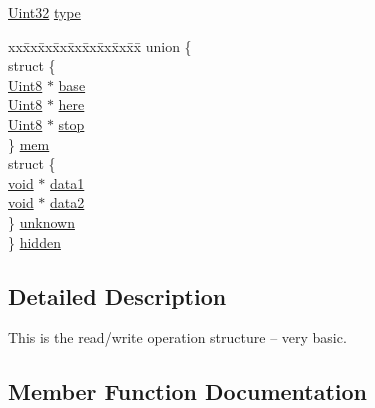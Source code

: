 \begin{DoxyCompactItemize}
\mbox{\hyperlink{_s_d_l__stdinc_8h_add440eff171ea5f55cb00c4a9ab8672d}{Uint32}} \mbox{\hyperlink{struct_s_d_l___r_wops_a099017bfceaac24ced0e4d08a4e0a023}{type}}
\item 
\begin{tabbing}
xx\=xx\=xx\=xx\=xx\=xx\=xx\=xx\=xx\=\kill
union \{\\
\>struct \{\\
\>\>\mbox{\hyperlink{_s_d_l__stdinc_8h_a2944638813a090aa23e62f4da842c3e2}{Uint8}} $\ast$ \mbox{\hyperlink{struct_s_d_l___r_wops_af9b489d7342296ce197b911cfa93b2ab}{base}}\\
\>\>\mbox{\hyperlink{_s_d_l__stdinc_8h_a2944638813a090aa23e62f4da842c3e2}{Uint8}} $\ast$ \mbox{\hyperlink{struct_s_d_l___r_wops_a6fc84601c17e347c6ef24c63a79deb57}{here}}\\
\>\>\mbox{\hyperlink{_s_d_l__stdinc_8h_a2944638813a090aa23e62f4da842c3e2}{Uint8}} $\ast$ \mbox{\hyperlink{struct_s_d_l___r_wops_a4108a41afa8b62e75b0f160de4b56103}{stop}}\\
\>\} \mbox{\hyperlink{struct_s_d_l___r_wops_a540713999ec73a45a71b3f12b674c2b0}{mem}}\\
\>struct \{\\
\>\>\mbox{\hyperlink{_s_d_l__opengles2__gl2ext_8h_ae5d8fa23ad07c48bb609509eae494c95}{void}} $\ast$ \mbox{\hyperlink{struct_s_d_l___r_wops_ab89d27b4312c0b9d664c81bc92917fc8}{data1}}\\
\>\>\mbox{\hyperlink{_s_d_l__opengles2__gl2ext_8h_ae5d8fa23ad07c48bb609509eae494c95}{void}} $\ast$ \mbox{\hyperlink{struct_s_d_l___r_wops_aca073130e2e262eb11e86e1be993e215}{data2}}\\
\>\} \mbox{\hyperlink{struct_s_d_l___r_wops_a6b636d6299921142a119931d76a588b7}{unknown}}\\
\} \mbox{\hyperlink{struct_s_d_l___r_wops_a282e9150d26585bdf1590726190e62f3}{hidden}}\\

\end{tabbing}\end{DoxyCompactItemize}


\subsection{Detailed Description}
This is the read/write operation structure -- very basic. 

\subsection{Member Function Documentation}
\mbox{\label{struct_s_d_l___r_wops_ab303bcbb0f6742a141ba8b2998923f47}} 
